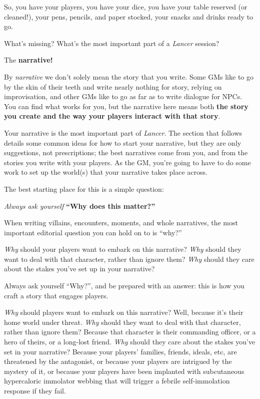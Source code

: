 So, you have your players, you have your dice, you have your table reserved (or cleaned!), your
pens, pencils, and paper stocked, your snacks and drinks ready to go.

What's missing? What's the most important part of a \textit{Lancer} session?

The \textbf{narrative!}

By \textit{narrative} we don't solely mean the story that you write. Some GMs like to go by the skin of
their teeth and write nearly nothing for story, relying on improvisation, and other GMs like to go
as far as to write dialogue for NPCs. You can find what works for you, but the narrative here
means both \textbf{the story you create and the way your players interact with that story}.

Your narrative is the most important part of \textit{Lancer}. The section that follows details some
common ideas for how to start your narrative, but they are only suggestions, not prescriptions;
the best narratives come from you, and from the stories you write with your players. As the GM,
you're going to have to do some work to set up the world(s) that your narrative takes place
across.

The best starting place for this is a simple question:

\textit{Always ask yourself}  \textbf{``Why does this matter?''}

When writing villains, encounters, moments, and whole narratives, the most important editorial
question you can hold on to is ``why?''

\textit{Why} should your players want to embark on this narrative? \textit{Why} should they want to deal with
that character, rather than ignore them? \textit{Why} should they care about the stakes you've set up in
your narrative?

Always ask yourself ``Why?'', and be prepared with an answer: this is how you craft a story that
engages players.

\textit{Why} should players want to embark on this narrative? Well, because it's their home world under
threat. \textit{Why} should they want to deal with that character, rather than ignore them? Because that
character is their commanding officer, or a hero of theirs, or a long-lost friend. \textit{Why} should they
care about the stakes you've set in your narrative? Because your players' families, friends,
ideals, etc, are threatened by the antagonist, or because your players are intrigued by the
mystery of it, or because your players have been implanted with subcutaneous hypercaloric
immolator webbing that will trigger a febrile self-immolation response if they fail.


